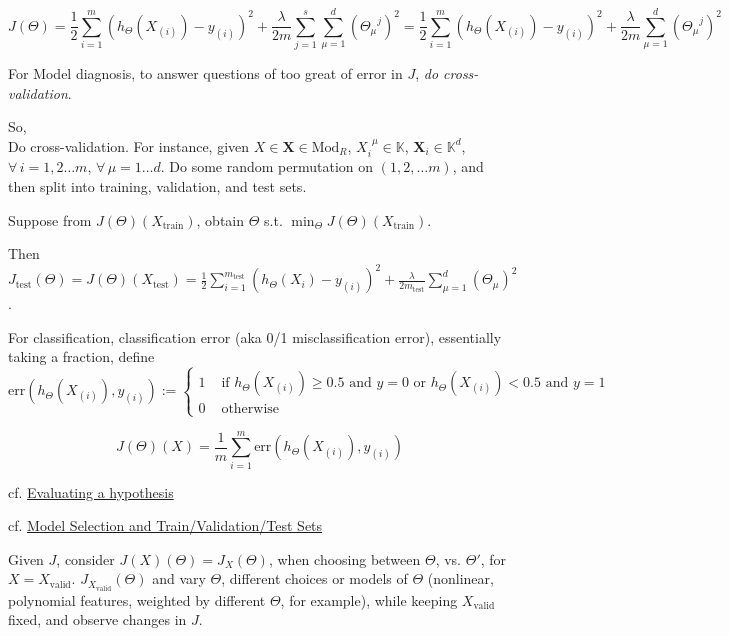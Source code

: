 \documentclass[10pt]{amsart}
\begin{document}
\begin{multicols*}{2}
\begin{equation}
	J(\Theta) = \frac{1}{2} \sum_{i=1}^m (h_{\Theta}(X_{(i)}) - y_{(i)} )^2 + \frac{\lambda}{2m} \sum_{j=1}^s \sum_{\mu=1}^d (\Theta_{\mu}^{\  \  \  j })^2 =  \frac{1}{2} \sum_{i=1}^m (h_{\Theta}(X_{(i)} ) - y_{(i)} )^2 + \frac{\lambda}{2m} \sum_{\mu =1}^d (\Theta_{\mu}^{ \  \  \  j })^2 
\end{equation}

For Model diagnosis, to answer questions of too great of error in $J$, \emph{do cross-validation}.  

So, \\

Do cross-validation.  For instance, given $X \in \mathbf{X} \in \text{Mod}_{R}$, $X_i^{ \  \  \mu } \in \mathbb{K}$, $\mathbf{X}_i \in \mathbb{K}^d$, \, $\forall \, i =1,2\dots m$, $\forall \, \mu =1\dots d$.  Do some random permutation on $(1,2,\dots m)$, and then split into training, validation, and test sets.  

Suppose from $J(\Theta)(X_{\text{train}})$, obtain $\Theta$ s.t. $\min_{\Theta} J(\Theta)(X_{\text{train}})$.  

Then $J_{\text{test}}(\Theta) = J(\Theta)(X_{\text{test}}) = \frac{1}{2} \sum_{i=1}^{m_{\text{test}}} (h_{\Theta}(X_i) - y_{(i)} )^2 + \frac{\lambda}{2m_{\text{test}}} \sum_{\mu=1}^d (\Theta_{\mu})^2 $.  

For classification, classification error (aka 0/1 misclassification error), essentially taking a fraction, define
\begin{equation}
	\text{err}(h_{\Theta}(X_{(i)} ), y_{(i)} ) := \begin{cases} 1 & \text{ if } h_{\Theta}(X_{(i)} ) \geq 0.5 \text{ and } y=0 \text{ or } h_{\Theta}(X_{(i)}) < 0.5 \text{ and } y=1 \\ 
0 & \text{ otherwise } \end{cases}
\end{equation}

\[
J(\Theta)(X) = \frac{1}{m} \sum_{i=1}^m \text{err}(h_{\Theta}(X_{(i)}), y_{(i)} )
\]


cf. \href{https://www.coursera.org/learn/machine-learning/supplement/aFpD3/evaluating-a-hypothesis}{Evaluating a hypothesis}

cf. \href{https://www.coursera.org/learn/machine-learning/lecture/QGKbr/model-selection-and-train-validation-test-sets}{Model Selection and Train/Validation/Test Sets}

Given $J$, consider $J(X)(\Theta) = J_X(\Theta)$, when choosing between $\Theta$, vs. $\Theta'$, for $X=X_{\text{valid}}$.  $J_{X_{\text{valid}}}(\Theta)$ and vary $\Theta$, different choices or models of $\Theta$ (nonlinear, polynomial features, weighted by different $\Theta$, for example), while keeping $X_{\text{valid}}$ fixed, and observe changes in $J$.  


\end{multicols*}
\end{document}
